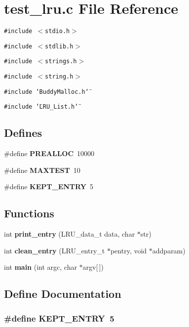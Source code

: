 \section{test\_\-lru.c File Reference}
\label{test__lru_8c}
{\tt \#include $<$stdio.h$>$}\par
{\tt \#include $<$stdlib.h$>$}\par
{\tt \#include $<$strings.h$>$}\par
{\tt \#include $<$string.h$>$}\par
{\tt \#include \char`\"{}BuddyMalloc.h\char`\"{}}\par
{\tt \#include \char`\"{}LRU\_\-List.h\char`\"{}}\par
\subsection*{Defines}
\begin{CompactItemize}
\item 
\#define {\bf PREALLOC}~10000
\item 
\#define {\bf MAXTEST}~10
\item 
\#define {\bf KEPT\_\-ENTRY}~5
\end{CompactItemize}
\subsection*{Functions}
\begin{CompactItemize}
\item 
int {\bf print\_\-entry} (LRU\_\-data\_\-t data, char $\ast$str)
\item 
int {\bf clean\_\-entry} (LRU\_\-entry\_\-t $\ast$pentry, void $\ast$addparam)
\item 
int {\bf main} (int argc, char $\ast$argv[$\,$])
\end{CompactItemize}


\subsection{Define Documentation}
\subsubsection[{KEPT\_\-ENTRY}]{\setlength{\rightskip}{0pt plus 5cm}\#define KEPT\_\-ENTRY~5}\label{test__lru_8c_32947fb41aad50de0587ec096a0daebc}




